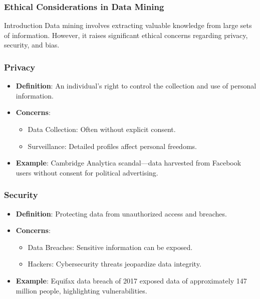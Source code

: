 \documentclass{beamer}
\begin{document}
\begin{frame}[fragile]
    \frametitle{Ethical Considerations in Data Mining}
    \begin{block}{Introduction}
        Data mining involves extracting valuable knowledge from large sets of information. However, it raises significant ethical concerns regarding privacy, security, and bias.
    \end{block}
\end{frame}

\begin{frame}[fragile]
    \frametitle{Privacy}
    \begin{itemize}
        \item \textbf{Definition}: An individual's right to control the collection and use of personal information.
        \item \textbf{Concerns}:
        \begin{itemize}
            \item Data Collection: Often without explicit consent.
            \item Surveillance: Detailed profiles affect personal freedoms.
        \end{itemize}
        \item \textbf{Example}: Cambridge Analytica scandal—data harvested from Facebook users without consent for political advertising.
    \end{itemize}
\end{frame}

\begin{frame}[fragile]
    \frametitle{Security}
    \begin{itemize}
        \item \textbf{Definition}: Protecting data from unauthorized access and breaches.
        \item \textbf{Concerns}:
        \begin{itemize}
            \item Data Breaches: Sensitive information can be exposed.
            \item Hackers: Cybersecurity threats jeopardize data integrity.
        \end{itemize}
        \item \textbf{Example}: Equifax data breach of 2017 exposed data of approximately 147 million people, highlighting vulnerabilities.
    \end{itemize}
\end{frame}
\end{document}
